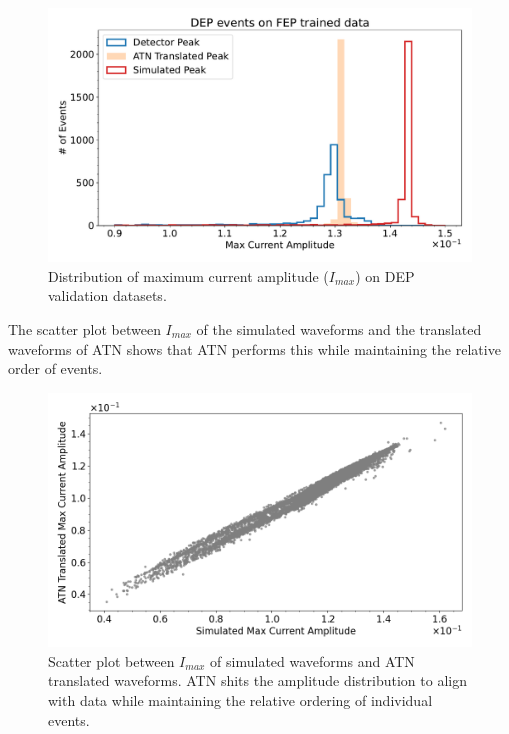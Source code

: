 \begin{figure}[htb!]
\centering
\includegraphics[width=0.99\linewidth,trim={0pc 0pc 0pc 0pc},clip]{ch8/figs/DEP_amp.pdf}
\caption{ Distribution of maximum current amplitude ($I_{max}$) on DEP validation datasets.}
\label{fig:current_amp_dep}
\end{figure}

The scatter plot between $I_{max}$ of the simulated waveforms and the translated waveforms of ATN shows that ATN performs this while maintaining the relative order of events.

\begin{figure}[htb!]
\centering
\includegraphics[width=0.99\linewidth,trim={0pc 0pc 0pc 0pc},clip]{ch8/figs/SEP_scatter_current_amplitude.png}
\caption{Scatter plot between $I_{max}$ of simulated waveforms and ATN translated waveforms. ATN shits the amplitude distribution to align with data while maintaining the relative ordering of individual events.}
\label{fig:current_amp}
\end{figure}



